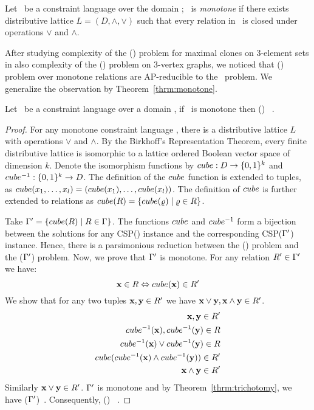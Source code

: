 \begin{defi}
Let \mrelset\ be a constraint language over the domain \mD; \mrelset\ is \emph{monotone}
if there exists distributive lattice \(L=(D,\wedge,\vee)\) such that every relation 
in \mrelset\ is closed under operations \(\vee\) and \(\wedge\)\@.
\end{defi}

After studying complexity of the \ccsp(\mrelset) problem for maximal clones on 3-element sets
in \cite{mvl} also complexity of the \chom(\mH) problem on 3-vertex graphs,
we noticed that \ccsp(\mrelset) problem over 
monotone relations are AP-reducible to the \cdsp\ problem. We generalize the observation by
Theorem~\ref{thrm:monotone}\@.

\begin{theorem} \label{thrm:monotone}
Let \mrelset\ be a constraint language over a domain \mD, if 
\mrelset\ is monotone then \ccsp(\mrelset) \maple\ \cbis\@.
\end{theorem}

\begin{proof}
For any monotone constraint language \mrelset, there is a distributive lattice \(L\) with operations
\(\vee\) and \(\wedge\)\@. By the Birkhoff's Representation Theorem, every finite distributive lattice
is isomorphic to a lattice ordered Boolean vector space of dimension \(k\)\@.
Denote the isomorphism functions by \(cube: D \to \{{0,1}\}^k\) and 
\(cube^{-1} : \{{0,1}\}^k\to D\)\@. The definition of the \(cube\) function
is extended to tuples, as \(cube(x_1,\dotsc,x_l)=(cube(x_1),\dotsc,cube(x_l))\)\@.
The definition of \(cube\) is further extended to relations as 
\(cube(R) = \{{cube(\varrho) \mid \varrho \in R}\}\)\@.

Take \(\Gamma'=\{{cube(R)\mid R\in \Gamma}\}\)\@. The functions \(cube\) and
\(cube^{-1}\) form a bijection between the solutions for any CSP(\mrelset) instance and the 
corresponding CSP(\(\Gamma'\)) instance. Hence, there is a parsimonious reduction between 
the \ccsp(\mrelset) problem and the \ccsp(\(\Gamma'\)) problem. Now, we prove that
\(\Gamma'\) is monotone. For any relation \(R' \in \Gamma'\) we have:
\[\textbf{x} \in R \Leftrightarrow cube(\textbf{x}) \in R'\]
We show that for any two tuples \(\textbf{x},\textbf{y}\in R'\) we have 
\(\textbf{x} \vee \textbf{y}, \textbf{x}\wedge\textbf{y}\in R'\).
\begin{eqnarray*}
\textbf{x},\textbf{y} \in R'  \\
cube^{-1}(\textbf{x}),cube^{-1}(\textbf{y})\in R  \\
cube^{-1}(\textbf{x}) \vee cube^{-1}(\textbf{y}) \in R  \\
cube(cube^{-1}(\textbf{x})\wedge cube^{-1}(\textbf{y}))\in R' \\
\textbf{x} \wedge \textbf{y} \in R' \\
\end{eqnarray*}
Similarly \(\textbf{x} \vee \textbf{y} \in R'\)\@.
\(\Gamma'\) is monotone and by Theorem~\ref{thrm:trichotomy}, we have 
\ccsp(\(\Gamma'\))\maple\ \cbis\@. Consequently, \ccsp(\mrelset) \maple\ \cbis\@.
\end{proof}

